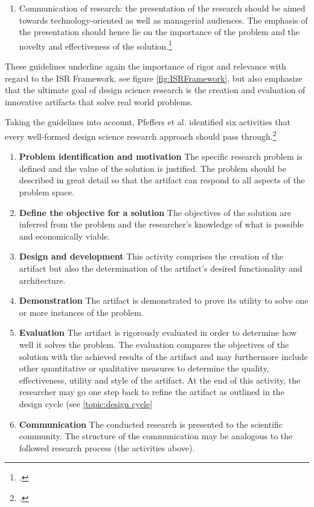 \begin{enumerate}
    \item Communication of research: the presentation of the research should be aimed towards technology-oriented as well as managerial audiences. The emphasis of the presentation should hence lie on the importance of the problem and the novelty and effectiveness of the solution.\footcites[Cf.][p.iv]{ZmudEditorComments1997}[cf.][pp.83,90]{HevnerDesignScienceResearch2004}
\end{enumerate}

These guidelines underline again the importance of rigor and relevance with regard to the ISR Framework, see figure \ref{fig:ISRFramework}, but also emphasize that the ultimate goal of design science research is the creation and evaluation of innovative artifacts that solve real world problems.

Taking the guidelines into account, Pfeffers et al. identified six activities that every well-formed design science research approach should pass through.\footcite[Cf.][pp.12-18]{PfeffersDesignScienceResearch2007}

\begin{enumerate}
    \item \textbf{Problem identification and motivation} The specific research problem is defined and the value of the solution is justified. The problem should be described in great detail so that the artifact can respond to all aspects of the problem space.
    \item \textbf{Define the objective for a solution} The objectives of the solution are inferred from the problem and the researcher's knowledge of what is possible and economically viable.
    \item \textbf{Design and development} This activity comprises the creation of the artifact but also the determination of the artifact's desired functionality and architecture. 
    \item \textbf{Demonstration} The artifact is demonstrated to prove its utility to solve one or more instances of the problem.
    \item \textbf{Evaluation} The artifact is rigorously evaluated in order to determine how well it solves the problem. The evaluation compares the objectives of the solution with the achieved results of the artifact and may furthermore include other quantitative or qualitative measures to determine the quality, effectiveness, utility and style of the artifact. At the end of this activity, the researcher may go one step back to refine the artifact as outlined in the design cycle (see \ref{topic:design cycle}
    \item \textbf{Communication} The conducted research is presented to the scientific community. The structure of the communication may be analogous to the followed research process (the activities above).
\end{enumerate}

